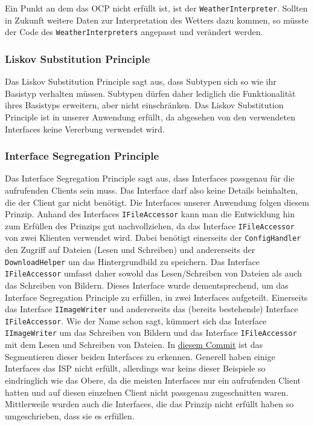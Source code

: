 Ein Punkt an dem das OCP nicht erfüllt ist, ist der \texttt{WeatherInterpreter}. Sollten in Zukunft weitere Daten zur Interpretation des Wetters dazu kommen, so müsste der Code des \texttt{WeatherInterpreters} angepasst und verändert werden.
\subsubsection{Liskov Substitution Principle}
Das Liskov Substitution Principle sagt aus, dass Subtypen sich so wie ihr Basistyp verhalten müssen. Subtypen dürfen daher lediglich die Funktionalität ihres Basistyps erweitern, aber nicht einschränken.
Das Liskov Substitution Principle ist in unserer Anwendung erfüllt, da abgesehen von den verwendeten Interfaces keine Vererbung verwendet wird.
\subsubsection{Interface Segregation Principle}
Das Interface Segregation Principle sagt aus, dass Interfaces passgenau für die aufrufenden Clients sein muss. Das Interface darf also keine Details beinhalten, die der Client gar nicht benötigt.
Die Interfaces unserer Anwendung folgen diesem Prinzip. Anhand des Interfaces \texttt{IFileAccessor} kann man die Entwicklung hin zum Erfüllen des Prinzips gut nachvollziehen, da das Interface \texttt{IFileAccessor} von zwei Klienten verwendet wird. Dabei benötigt einerseits der \texttt{ConfigHandler} den Zugriff auf Dateien (Lesen und Schreiben) und andererseits der \texttt{DownloadHelper} um das Hintergrundbild zu speichern. Das Interface \texttt{IFileAccessor} umfasst daher sowohl das Lesen/Schreiben von Dateien als auch das Schreiben von Bildern. Dieses Interface wurde dementsprechend, um das Interface Segregation Principle zu erfüllen, in zwei Interfaces aufgeteilt. Einerseits das Interface \texttt{IImageWriter} und andererseits das (bereits bestehende) Interface \texttt{IFileAccessor}. Wie der Name schon sagt, kümmert sich das Interface \texttt{IImageWriter} um das Schreiben von Bildern und das Interface \texttt{IFileAccessor} mit dem Lesen und Schreiben von Dateien. In \href{https://github.com/Bronzila/WeatherWallpaper/commit/8db38466c2185e16ef90f71af485e00b57b09032}{\color{blue}diesem Commit} ist das Segmentieren dieser beiden Interfaces zu erkennen.
Generell haben einige Interfaces das ISP nicht erfüllt, allerdings war keins dieser Beispiele so eindringlich wie das Obere, da die meisten Interfaces nur ein aufrufenden Client hatten und auf diesen einzelnen Client nicht passgenau zugeschnitten waren. Mittlerweile wurden auch die Interfaces, die das Prinzip nicht erfüllt haben so umgeschrieben, dass sie es erfüllen.
